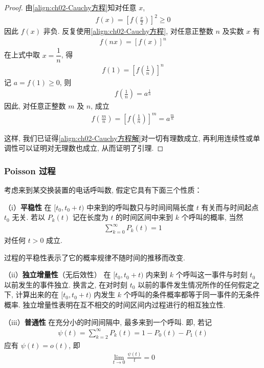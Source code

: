 \documentclass[../../main.tex]{subfiles}
\begin{document}
\begin{proof}
由\cref{align:ch02-Cauchy方程}知对任意 $x$,
\begin{align*}
f(x)=\left[f\left(\frac{x}{2}\right)\right]^2\geqslant 0
\end{align*}
因此 $f(x)$ 非负. 反复使用\cref{align:ch02-Cauchy方程}, 对任意正整数 $n$ 及实数 $x$ 有
\begin{align*}
f(nx)=[f(x)]^n
\end{align*}
在上式中取 $x=\dfrac{1}{n}$, 得
\begin{align*}
f(1)=\left[f\left(\frac{1}{n}\right)\right]^n
\end{align*}
记 $a=f(1)\geqslant 0$, 则
\begin{align*}
f\left(\frac{1}{n}\right)=a^{\frac{1}{n}}
\end{align*}
因此, 对任意正整数 $m$ 及 $n$, 成立
\begin{align*}
f\left(\frac{m}{n}\right)=\left[f\left(\frac{1}{n}\right)\right]^m=a^{\frac{m}{n}}
\end{align*}

这样, 我们已证得\cref{align:ch02-Cauchy方程解}对一切有理数成立, 再利用连续性或单调性可以证明对无理数也成立, 从而证明了引理.
\end{proof}

\subsubsection*{Poisson 过程}

考虑来到某交换装置的电话呼叫数, 假定它具有下面三个性质：

（i）\textbf{平稳性} 在 $[t_0,t_0+t)$ 中来到的呼叫数只与时间间隔长度 $t$ 有关而与时间起点 $t_0$ 无关. 若以 $P_k(t)$ 记在长度为 $t$ 的时间区间中来到 $k$ 个呼叫的概率, 当然
\begin{align}
\sum_{k=0}^{\infty}P_k(t)=1\label{align:ch02-Pk归一化}
\end{align}
对任何 $t>0$ 成立.

过程的平稳性表示了它的概率规律不随时间的推移而改变.

（ii）\textbf{独立增量性}（无后效性） 在 $[t_0,t_0+t)$ 内来到 $k$ 个呼叫这一事件与时刻 $t_0$ 以前发生的事件独立. 换言之, 在对时刻 $t_0$ 以前的事件发生情况所作的任何假定之下, 计算出来的在 $[t_0,t_0+t)$ 内发生 $k$ 个呼叫的条件概率都等于同一事件的无条件概率. 独立增量性表明在互不相交的时间区间内过程进行的相互独立性.

（iii）\textbf{普通性} 在充分小的时间间隔中, 最多来到一个呼叫. 即, 若记
\begin{align}
\psi(t)=\sum_{k=2}^{\infty}P_k(t)=1-P_0(t)-P_1(t)\label{align:ch02-Psi定义}
\end{align}
应有 $\psi(t)=o(t)$, 即
\begin{align}
\lim_{t\to 0}\frac{\psi(t)}{t}=0\label{align:ch02-普通性}
\end{align}
\end{document}
